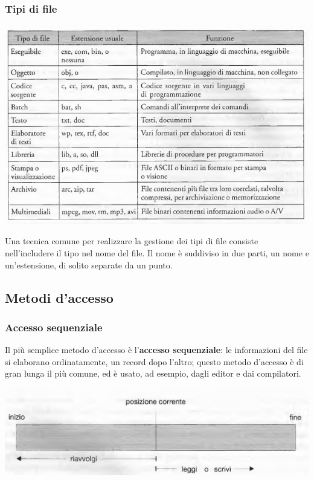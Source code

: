 \documentclass[11pt,a4paper]{article}
\begin{document}
{\subsubsection{Tipi di file}
\begin{center}
  \includegraphics[scale=0.6]{img/0059.png}
\end{center}
Una tecnica comune per realizzare la gestione dei tipi di file consiste nell'includere il ti­po nel nome del file. Il nome è suddiviso in due parti, un nome e un'estensione, di solito sepa­rate da un punto.

\subsection{Metodi d'accesso}
\subsubsection{Accesso sequenziale}
Il più semplice metodo d'accesso è l'\textbf{accesso sequenziale}: le informazioni del file si elabora­no ordinatamente, un record dopo l'altro; questo metodo d'accesso è di gran lunga il più co­mune, ed è usato, ad esempio, dagli editor e dai compilatori.
\begin{center}
  \includegraphics[scale=0.6]{img/0060.png}
\end{center}

}
\end{document}
